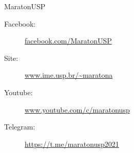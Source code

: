 \begin{subsecao}{MaratonUSP}
\begin{description}
\item [Facebook:] \url{facebook.com/MaratonUSP}
\item[Site:] \url{www.ime.usp.br/~maratona}
\item[Youtube:] \url{www.youtube.com/c/maratonusp}
\item[Telegram:] \url{https://t.me/maratonusp2021}

\end{description}

\end{subsecao}
